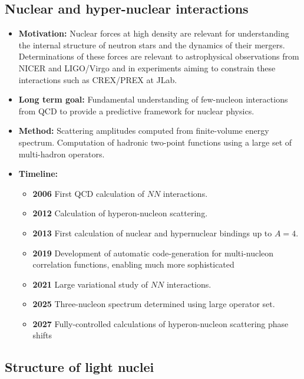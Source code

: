 \documentclass[12pt,hyperpdf]{article}
\begin{document}
\subsection{Nuclear and hyper-nuclear interactions}

\begin{itemize}
    \item{\bf Motivation:} Nuclear forces at high density are relevant for understanding  the internal structure  of neutron stars and the dynamics of their mergers. Determinations of these forces are relevant to astrophysical observations from NICER and LIGO/Virgo and in experiments aiming to constrain  these interactions such as CREX/PREX at JLab.
   
    \item{\bf Long term goal:} Fundamental understanding of few-nucleon interactions from QCD to provide a predictive framework for nuclear physics. 
    
    \item{\bf Method:} Scattering
      amplitudes computed from finite-volume energy spectrum. Computation of hadronic two-point functions
      using a large set of multi-hadron operators.
      
\item{\bf Timeline:}
\begin{itemize}
   \item{\bf 2006} First QCD calculation of $NN$ interactions.
    \item{\bf 2012} Calculation of hyperon-nucleon scattering.
    \item{\bf 2013} First calculation of nuclear and hypernuclear bindings up to $A=4$.
    \item{\bf 2019} Development of automatic code-generation for multi-nucleon correlation functions, enabling much more sophisticated 
    \item{\bf 2021} Large variational study of $NN$ interactions.
    \item{\bf 2025} Three-nucleon spectrum determined using large operator set.
    \item{\bf 2027} Fully-controlled calculations of hyperon-nucleon scattering phase shifts
    
\end{itemize}
\end{itemize}


\subsection{Structure of light nuclei}
\end{document}
